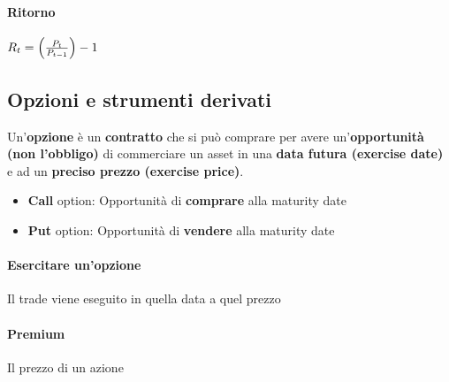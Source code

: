 \documentclass[12pt]{article}
\begin{document}
\paragraph{Ritorno} $R_t = \left({P_t\over P_{t-1}}\right) - 1$
\newpage
\subsection{Opzioni e strumenti derivati}
Un'\textbf{opzione} è un \textbf{contratto} che si può comprare per avere un'\textbf{opportunità} \textbf{(non l'obbligo)} di commerciare un asset in una \textbf{data futura (exercise date)} e ad un \textbf{preciso prezzo (exercise price)}.
\begin{itemize}
    \item \textbf{Call} option: Opportunità di \textbf{comprare} alla maturity date
    \item \textbf{Put} option: Opportunità di \textbf{vendere} alla maturity date
\end{itemize}
\paragraph{Esercitare un'opzione} Il trade viene eseguito in quella data a quel prezzo
\paragraph{Premium} Il prezzo di un azione
\end{document}
